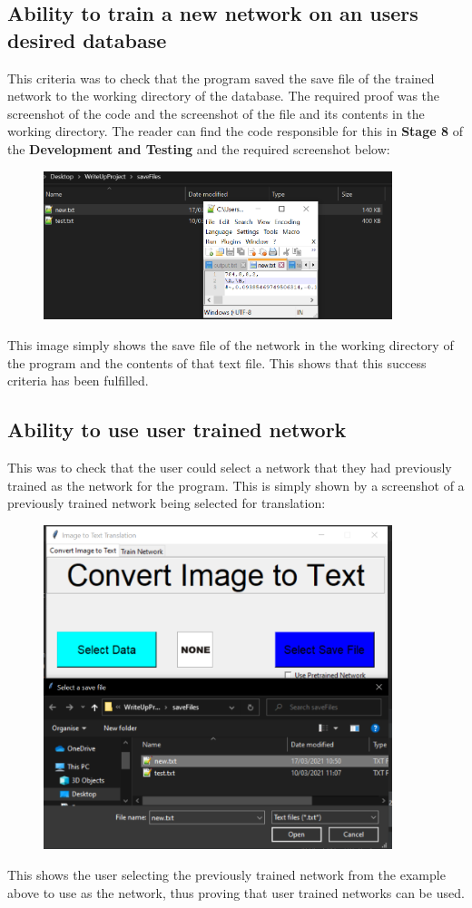 \documentclass{report}
\begin{document}
\subsection{Ability to train a new network on an users desired database}
This criteria was to check that the program saved the save file of the trained network to the working directory of the database. The required proof was the screenshot of the code and the screenshot of the file and its contents in the working directory. The reader can find the code responsible for this in \textbf{Stage 8} of the \textbf{Development and Testing} and the required screenshot below:
\begin{figure}[H]
    \centering
    \includegraphics[width=4in]{Images/Evaluation/Success Criteria Proof/Training Output Screenshot.png}
\end{figure}
\noindent This image simply shows the save file of the network in the working directory of the program and the contents of that text file. This shows that this success criteria has been fulfilled.
\subsection{Ability to use user trained network}
This was to check that the user could select a network that they had previously trained as the network for the program. This is simply shown by a screenshot of a previously trained network being selected for translation:
\begin{figure}[H]
    \centering
    \includegraphics[width=4in]{Images/Evaluation/Success Criteria Proof/User Save File being selected screenshot.png}
\end{figure}
\noindent This shows the user selecting the previously trained network from the example above to use as the network, thus proving that user trained networks can be used.
\end{document}
